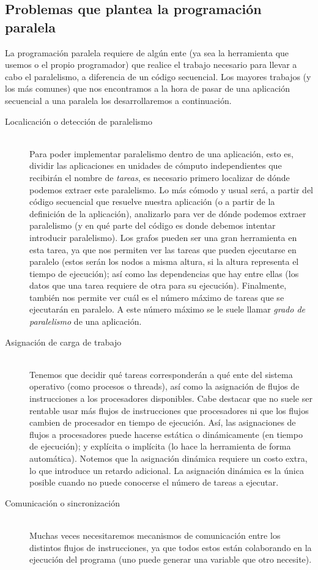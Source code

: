 \subsection{Problemas que plantea la programación paralela}
La programación paralela requiere de algún ente (ya sea la herramienta que usemos o el propio programador) que realice el trabajo necesario para llevar a cabo el paralelismo, a diferencia de un código secuencial. Los mayores trabajos (y los más comunes) que nos encontramos a la hora de pasar de una aplicación secuencial a una paralela los desarrollaremos a continuación.

\begin{description}
    \item [Localicación o detección de paralelismo]~\\
        Para poder implementar paralelismo dentro de una aplicación, esto es, dividir las aplicaciones en unidades de cómputo independientes que recibirán el nombre de \emph{tareas}, es necesario primero localizar de dónde podemos extraer este paralelismo. Lo más cómodo y usual será, a partir del código secuencial que resuelve nuestra aplicación (o a partir de la definición de la aplicación), analizarlo para ver de dónde podemos extraer paralelismo (y en qué parte del código es donde debemos intentar introducir paralelismo). Los grafos pueden ser una gran herramienta en esta tarea, ya que nos permiten ver las tareas que pueden ejecutarse en paralelo (estos serán los nodos a misma altura, si la altura representa el tiempo de ejecución); así como las dependencias que hay entre ellas (los datos que una tarea requiere de otra para su ejecución). Finalmente, también nos permite ver cuál es el número máximo de tareas que se ejecutarán en paralelo. A este número máximo se le suele llamar \emph{grado de paralelismo} de una aplicación.
    \item [Asignación de carga de trabajo]~\\
        Tenemos que decidir qué tareas corresponderán a qué ente del sistema operativo (como procesos o threads), así como la asignación de flujos de instrucciones a los procesadores disponibles. Cabe destacar que no suele ser rentable usar más flujos de instrucciones que procesadores ni que los flujos cambien de procesador en tiempo de ejecución. Así, las asignaciones de flujos a procesadores puede hacerse estática o dinámicamente (en tiempo de ejecución); y explícita o implícita (lo hace la herramienta de forma automática). Notemos que la asignación dinámica requiere un costo extra, lo que introduce un retardo adicional. La asignación dinámica es la única posible cuando no puede conocerse el número de tareas a ejecutar. 
    \item [Comunicación o sincronización]~\\
        Muchas veces necesitaremos mecanismos de comunicación entre los distintos flujos de instrucciones, ya que todos estos están colaborando en la ejecución del programa (uno puede generar una variable que otro necesite). 
\end{description}

